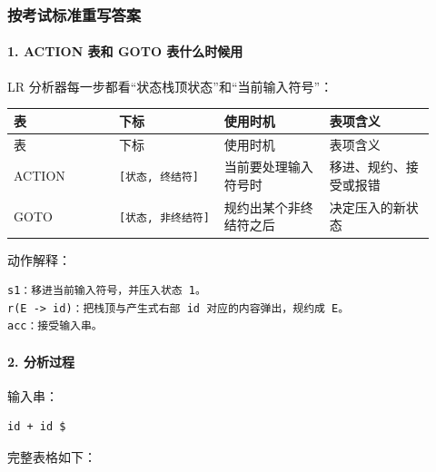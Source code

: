 \documentclass[UTF8]{ctexart}
\begin{document}
\subsubsection*{按考试标准重写答案}

\paragraph*{1. ACTION 表和 GOTO 表什么时候用}

LR 分析器每一步都看“状态栈顶状态”和“当前输入符号”：

\begin{longtable}{|p{0.23\linewidth}|p{0.23\linewidth}|p{0.23\linewidth}|p{0.23\linewidth}|}
\hline
表 & 下标 & 使用时机 & 表项含义 \\
\hline
\endfirsthead
表 & 下标 & 使用时机 & 表项含义 \\
\hline
\endhead
ACTION & \texttt{[状态, 终结符]} & 当前要处理输入符号时 & 移进、规约、接受或报错 \\
\hline
GOTO & \texttt{[状态, 非终结符]} & 规约出某个非终结符之后 & 决定压入的新状态 \\
\hline
\end{longtable}

动作解释：

\begin{Verbatim}[fontsize=\small,breaklines=true]
s1：移进当前输入符号，并压入状态 1。
r(E -> id)：把栈顶与产生式右部 id 对应的内容弹出，规约成 E。
acc：接受输入串。
\end{Verbatim}

\paragraph*{2. 分析过程}

输入串：

\begin{Verbatim}[fontsize=\small,breaklines=true]
id + id $
\end{Verbatim}

完整表格如下：
\end{document}
